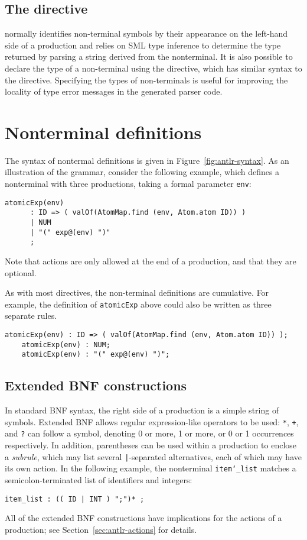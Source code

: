 \subsection{The  directive}
\mlantlr{} normally identifies non-terminal symbols by their appearance on the left-hand side
of a production and relies on SML type inference to determine the type returned by parsing
a string derived from the nonterminal.
It is also possible to declare the type of a non-terminal using the  directive, which has
similar syntax to the  directive.
Specifying the types of non-terminals is useful for improving the locality of type error
messages in the generated parser code.

\section{Nonterminal definitions}\label{sec:antlr-nt}

The syntax of nontermal definitions is given in Figure~\ref{fig:antlr-syntax}.  As an illustration of the grammar, consider the following example, which defines a nonterminal with three productions, taking a formal parameter \texttt{env}:
\begin{lstlisting}[language=MLAntlr]
    atomicExp(env)
      : ID => ( valOf(AtomMap.find (env, Atom.atom ID)) )
      | NUM
      | "(" exp@(env) ")"
      ;
\end{lstlisting}%
Note that actions are only allowed at the end of a production, and that they are optional.

As with most directives, the non-terminal definitions are cumulative.
For example, the definition of \texttt{atomicExp} above could also be
written as three separate rules.
\begin{lstlisting}[language=MLAntlr]
    atomicExp(env) : ID => ( valOf(AtomMap.find (env, Atom.atom ID)) );
    atomicExp(env) : NUM;
    atomicExp(env) : "(" exp@(env) ")";
\end{lstlisting}%

\subsection{Extended BNF constructions}

In standard BNF syntax, the right side of a production is a simple string of symbols.  Extended BNF allows regular expression-like operators to be used: \texttt{*}, \texttt{+}, and \texttt{?} can follow a symbol, denoting 0 or more, 1 or more, or 0 or 1 occurrences respectively.  In addition, parentheses can be used within a production to enclose a \emph{subrule}, which may list several \texttt{|}-separated alternatives, each of which may have its own action.  In the following example, the nonterminal \texttt{item\char`\_list} matches a semicolon-terminated list of identifiers and integers:
\begin{lstlisting}[language=MLAntlr]
    item_list : (( ID | INT ) ";")* ;
\end{lstlisting}%
All of the extended BNF constructions have implications for the actions of a production; see Section~\ref{sec:antlr-actions} for details.

